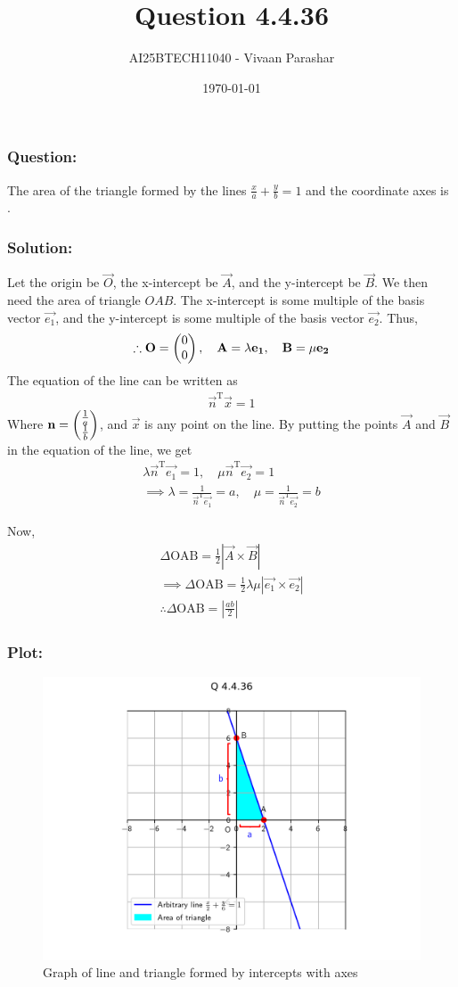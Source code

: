 \documentclass{beamer}
\title{Question 4.4.36}
\author{AI25BTECH11040 - Vivaan Parashar}
\date{\today}
\begin{document}
\frame{\titlepage}

\begin{frame}
    \frametitle{Question: }
    The area of the triangle formed by the lines $\frac{x}{a} + \frac{y}{b} = 1$ and the coordinate axes is \underline{\hspace{2cm}}.
\end{frame}

\begin{frame}
    \frametitle{Solution: }
    Let the origin be $\vec{O}$, the x-intercept be $\vec{A}$, and the y-intercept be $\vec{B}$. We then need the area of triangle $OAB$.
The x-intercept is some multiple of the basis vector $\vec{e_1}$, and the y-intercept is some multiple of the basis vector $\vec{e_2}$. Thus,
\begin{align}
    \therefore \mathbf{O} = \begin{pmatrix}0 \\ 0\end{pmatrix}, \quad \mathbf{A} = \lambda\mathbf{e_1}, \quad \mathbf{B} = \mu\mathbf{e_2}
\end{align}
The equation of the line can be written as
\begin{align}
    \vec{n}^{\mathrm{T}}\vec{x} = 1
\end{align}
Where $\mathbf{n} = \begin{pmatrix}\frac{1}{a} \\ \frac{1}{b}\end{pmatrix}$, and $\vec{x}$ is any point on the line.
By putting the points $\vec{A}$ and $\vec{B}$ in the equation of the line, we get
\begin{align}
    \lambda\vec{n}^{\mathrm{T}}\vec{e_1} = 1, \quad \mu\vec{n}^{\mathrm{T}}\vec{e_2} = 1\\
    \implies \lambda = \frac{1}{\vec{n}^{\mathrm{T}}\vec{e_1}} = a, \quad \mu = \frac{1}{\vec{n}^{\mathrm{T}}\vec{e_2}} = b
\end{align}
\end{frame}
\begin{frame}
    Now,
\begin{align}
    \Delta\text{OAB} = \frac{1}{2}\left|\vec{A}\times\vec{B}\right|\\
    \implies \Delta\text{OAB} = \frac{1}{2} \lambda \mu \left|\vec{e_1}\times\vec{e_2}\right|\\
    \therefore \Delta\text{OAB} = \left|\frac{ab}{2}\right|
\end{align}
\end{frame}

\begin{frame}
    \frametitle{Plot: }
    \begin{figure}[h!]
        \centering
        \includegraphics[width=0.9\columnwidth]{../figs/plot.png}
        \caption{Graph of line and triangle formed by intercepts with axes}
        \label{fig:4.4.36}
    \end{figure}
\end{frame}
\end{document}
